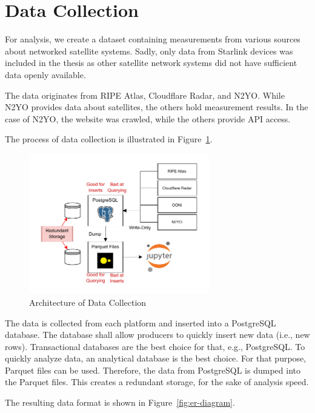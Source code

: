 \section{Data Collection} \label{sec:data-collection}

For analysis, we create a dataset containing measurements from various sources
about networked satellite systems. Sadly, only data from Starlink devices was
included in the thesis as other satellite network systems did not have
sufficient data openly available.

The data originates from RIPE Atlas, Cloudflare Radar, and N2YO. While
N2YO provides data about satellites, the others hold measurement results. In
the case of N2YO, the website was crawled, while the others provide API
access.

The process of data collection is illustrated in
Figure~\ref{fig:data-collection-process}.

\begin{figure}[h]
	\centering
	\includegraphics[width=0.7\textwidth]{./chapters/3-methodology/img/architecture.drawio.pdf}
	\caption{Architecture of Data Collection}
	\label{fig:data-collection-process}
\end{figure}

The data is collected from each platform and inserted into a PostgreSQL
database. The database shall allow producers to quickly insert new data (i.e.,
new rows). Transactional databases are the best choice for that, e.g.,
PostgreSQL. To quickly analyze data, an analytical database is the best choice.
For that purpose, Parquet files can be used. Therefore, the data from
PostgreSQL is dumped into the Parquet files. This creates a redundant storage,
for the sake of analysis speed.

The resulting data format is shown in Figure~\ref{fig:er-diagram}.

